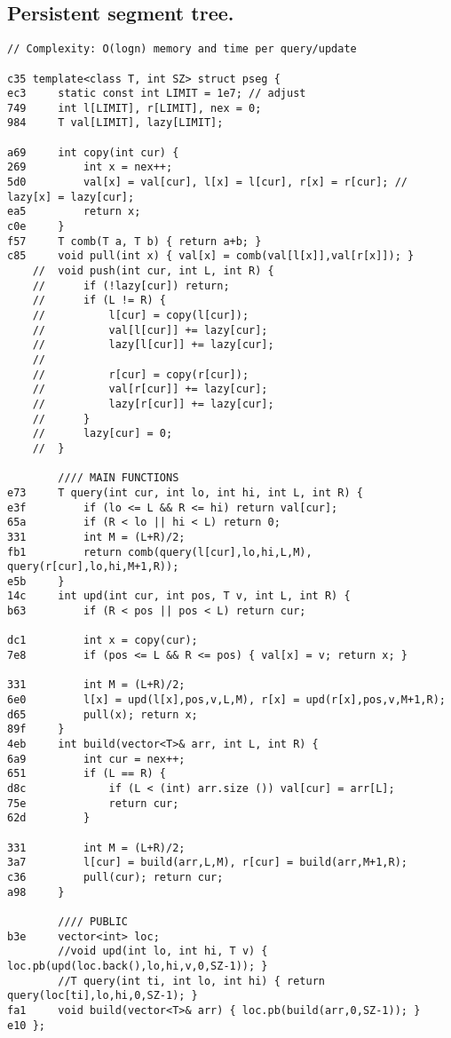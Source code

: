 \documentclass[11pt, a4paper, twoside]{article}
\begin{document}
\subsection{Persistent segment tree.}
\begin{lstlisting}
// Complexity: O(logn) memory and time per query/update

c35 template<class T, int SZ> struct pseg {
ec3     static const int LIMIT = 1e7; // adjust
749     int l[LIMIT], r[LIMIT], nex = 0;
984     T val[LIMIT], lazy[LIMIT];
        
a69     int copy(int cur) {
269         int x = nex++;
5d0         val[x] = val[cur], l[x] = l[cur], r[x] = r[cur]; // lazy[x] = lazy[cur];
ea5         return x;
c0e     }
f57     T comb(T a, T b) { return a+b; }
c85     void pull(int x) { val[x] = comb(val[l[x]],val[r[x]]); } 
    //  void push(int cur, int L, int R) { 
    //      if (!lazy[cur]) return;
    //      if (L != R) {
    //          l[cur] = copy(l[cur]);
    //          val[l[cur]] += lazy[cur];
    //          lazy[l[cur]] += lazy[cur];
    //          
    //          r[cur] = copy(r[cur]);
    //          val[r[cur]] += lazy[cur];
    //          lazy[r[cur]] += lazy[cur];
    //      }
    //      lazy[cur] = 0;
    //  }
     
        //// MAIN FUNCTIONS
e73     T query(int cur, int lo, int hi, int L, int R) {  
e3f         if (lo <= L && R <= hi) return val[cur];
65a         if (R < lo || hi < L) return 0;
331         int M = (L+R)/2;
fb1         return comb(query(l[cur],lo,hi,L,M), query(r[cur],lo,hi,M+1,R));
e5b     }
14c     int upd(int cur, int pos, T v, int L, int R) {
b63         if (R < pos || pos < L) return cur;
            
dc1         int x = copy(cur);
7e8         if (pos <= L && R <= pos) { val[x] = v; return x; }
            
331         int M = (L+R)/2;
6e0         l[x] = upd(l[x],pos,v,L,M), r[x] = upd(r[x],pos,v,M+1,R);
d65         pull(x); return x;
89f     }
4eb     int build(vector<T>& arr, int L, int R) {
6a9         int cur = nex++;
651         if (L == R) {
d8c             if (L < (int) arr.size ()) val[cur] = arr[L];
75e             return cur;
62d         }
            
331         int M = (L+R)/2;
3a7         l[cur] = build(arr,L,M), r[cur] = build(arr,M+1,R);
c36         pull(cur); return cur;
a98     }
        
        //// PUBLIC
b3e     vector<int> loc;
        //void upd(int lo, int hi, T v) { loc.pb(upd(loc.back(),lo,hi,v,0,SZ-1)); }
        //T query(int ti, int lo, int hi) { return query(loc[ti],lo,hi,0,SZ-1); }
fa1     void build(vector<T>& arr) { loc.pb(build(arr,0,SZ-1)); }
e10 };
\end{lstlisting}
\end{document}
